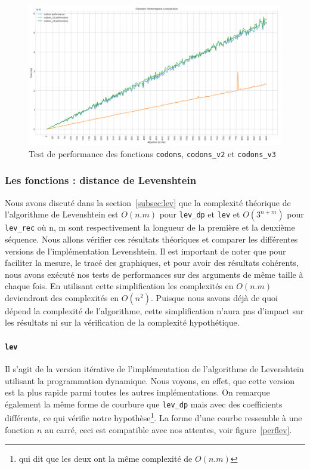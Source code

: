 \documentclass[12pt]{article}
\begin{document}
     \begin{figure}[!h]
        \centering
        \includegraphics[scale=0.8]{Images/Performance/Codons/performance_codons_comp3.png}
        \caption{Test de performance des fonctions \texttt{codons}, \texttt{codons\_v2} et \texttt{codons\_v3}}
        \label{perfcodons}
    \end{figure}



\subsubsection{Les fonctions : distance de Levenshtein}
Nous avons discuté dans la section~\ref{subsec:lev} que la complexité théorique de l'algorithme de Levenshtein est $O(n.m)$ pour \texttt{lev\_dp} et \texttt{lev} et $O(3^{n+m})$ pour \texttt{lev\_rec} où n, m sont respectivement la longueur de la première et la deuxième séquence. Nous allons vérifier ces résultats théoriques et comparer les différentes versions de l'implémentation Levenshtein. Il est important de noter que pour faciliter la mesure, le tracé des graphiques, et pour avoir des résultats cohérents, nous avons exécuté nos tests de performances sur des arguments de même taille à chaque fois. En utilisant cette simplification les complexités en $O(n.m)$ deviendront des complexités en $O(n^{2})$. Puisque nous savons déjà de quoi dépend la complexité de l'algorithme, cette simplification n'aura pas d'impact sur les résultats ni sur la vérification de la complexité hypothétique.

\paragraph{\texttt{lev}}
Il s'agit de la version itérative de l'implémentation de l'algorithme de Levenshtein utilisant la programmation dynamique. Nous voyons, en effet, que cette version est la plus rapide parmi toutes les autres implémentations. 
On remarque également la même forme de courbure que \texttt{lev\_dp} mais avec des coefficients différents, ce qui vérifie notre hypothèse\footnote{qui dit que les deux ont la même complexité de $O(n.m)$}. La forme d'une courbe ressemble à une fonction $n$ au carré, ceci est compatible avec nos attentes, voir figure~\ref{perflev}.
\end{document}

